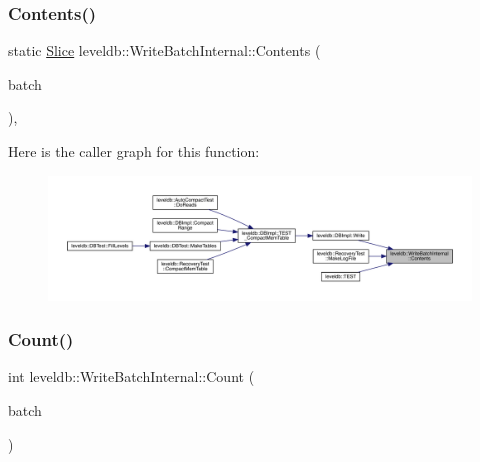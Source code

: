\mbox{\label{classleveldb_1_1_write_batch_internal_a348947b16653c8a17590b13115b5274d}} 
\subsubsection{\texorpdfstring{Contents()}{Contents()}}
{\footnotesize\ttfamily static \mbox{\hyperlink{classleveldb_1_1_slice}{Slice}} leveldb\+::\+Write\+Batch\+Internal\+::\+Contents (\begin{DoxyParamCaption}\item[{const \mbox{\hyperlink{classleveldb_1_1_write_batch}{Write\+Batch}} $\ast$}]{batch }\end{DoxyParamCaption})\hspace{0.3cm}{\ttfamily [inline]}, {\ttfamily [static]}}

Here is the caller graph for this function\+:
\nopagebreak
\begin{figure}[H]
\begin{center}
\leavevmode
\includegraphics[width=350pt]{classleveldb_1_1_write_batch_internal_a348947b16653c8a17590b13115b5274d_icgraph}
\end{center}
\end{figure}
\mbox{\label{classleveldb_1_1_write_batch_internal_a5270ca4567dbae1524005ad14e0698e3}} 
\subsubsection{\texorpdfstring{Count()}{Count()}}
{\footnotesize\ttfamily int leveldb\+::\+Write\+Batch\+Internal\+::\+Count (\begin{DoxyParamCaption}\item[{const \mbox{\hyperlink{classleveldb_1_1_write_batch}{Write\+Batch}} $\ast$}]{batch }\end{DoxyParamCaption})\hspace{0.3cm}{\ttfamily [static]}}

